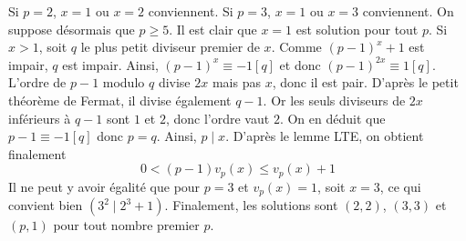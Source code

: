 \begin{sol}
Si $p=2$, $x=1$ ou $x=2$ conviennent. Si $p=3$, $x=1$ ou $x=3$ conviennent. On suppose désormais que $p\ge 5$. Il est clair que $x=1$ est solution pour tout $p$. Si $x>1$, soit $q$ le plus petit diviseur premier de $x$. Comme $(p-1)^x+1$ est impair, $q$ est impair. Ainsi, $(p-1)^x\equiv -1[q]$ et donc $(p-1)^{2x}\equiv 1[q]$. L'ordre de $p-1$ modulo $q$ divise $2x$ mais pas $x$, donc il est pair. D'après le petit théorème de Fermat, il divise également $q-1$. Or les seuls diviseurs de $2x$ inférieurs à $q-1$ sont $1$ et $2$, donc l'ordre vaut $2$. On en déduit que $p-1\equiv -1[q]$ donc $p=q$.
Ainsi, $p\mid x$. D'après le lemme LTE, on obtient finalement
$$0<(p-1)v_p(x)\le v_p(x)+1$$
Il ne peut y avoir égalité que pour $p=3$ et $v_p(x)=1$, soit $x=3$, ce qui convient bien $(3^2\mid 2^3+1)$. Finalement, les solutions sont $(2,2)$, $(3,3)$ et $(p,1)$ pour tout nombre premier $p$.
\end{sol}